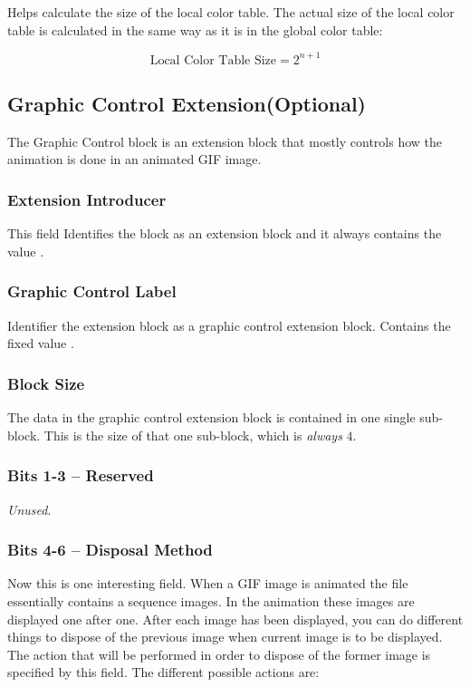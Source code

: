 \begin{refsection}
  Helps calculate the size of the local color table. The actual size
  of the local color table is calculated in the same way as it is in
  the global color table:

  \begin{equation*}
    \textrm{Local Color Table Size} = 2^{n + 1}
  \end{equation*}

  \subsection{Graphic Control Extension(Optional)}

  The Graphic Control block is an extension block that mostly controls
  how the animation is done in an animated GIF image.

  \subsubsection{Extension Introducer}

  This field Identifies the block as an extension block and it always
  contains the value .

  \subsubsection{Graphic Control Label}

  Identifier the extension block as a graphic control extension
  block. Contains the fixed value .

  \subsubsection{Block Size}

  The data in the graphic control extension block is contained in one
  single sub-block. This is the size of that one sub-block, which is
  \textit{always} $4$.

  \subsubsection{Bits 1-3 -- Reserved}

  \textit{Unused}.

  \subsubsection{Bits 4-6 -- Disposal Method}

  Now this is one interesting field. When a GIF image is animated the
  file essentially contains a sequence images. In the animation these
  images are displayed one after one. After each image has been
  displayed, you can do different things to dispose of the previous
  image when current image is to be displayed. The action that will be
  performed in order to dispose of the former image is specified by
  this field. The different possible actions are:


\end{refsection}

